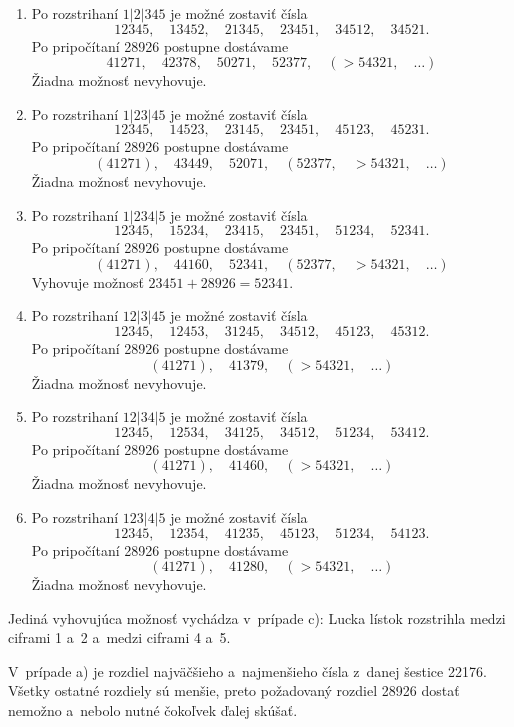 {\begin{enumerate}\alphatrue
\item
Po rozstrihaní $1|2|345$ je možné zostaviť čísla
$$
12345,\quad 13452,\quad 21345,\quad 23451,\quad 34512,\quad 34521.
$$
Po pripočítaní 28926 postupne dostávame
$$
41271,\quad 42378,\quad 50271, \quad 52377,\quad (>54321,\quad\dots)
$$
Žiadna možnosť nevyhovuje.
\item
Po rozstrihaní $1|23|45$ je možné zostaviť čísla
$$
12345,\quad 14523,\quad 23145,\quad 23451,\quad 45123,\quad 45231.
$$
Po pripočítaní 28926 postupne dostávame
$$
(41271),\quad 43449,\quad 52071,\quad (52377,\quad >54321,\quad\dots)
$$
Žiadna možnosť nevyhovuje.
\item
Po rozstrihaní $1|234|5$ je možné zostaviť čísla
$$
12345,\quad 15234,\quad 23415,\quad 23451,\quad 51234,\quad 52341.
$$
Po pripočítaní 28926 postupne dostávame
$$
(41271),\quad 44160,\quad 52341,\quad (52377,\quad >54321,\quad\dots)
$$
Vyhovuje možnosť $23451+28926=52341$.
\item
Po rozstrihaní $12|3|45$ je možné zostaviť čísla
$$
12345,\quad 12453,\quad 31245,\quad 34512,\quad 45123,\quad 45312.
$$
Po pripočítaní 28926 postupne dostávame
$$
(41271),\quad 41379,\quad (>54321,\quad\dots)
$$
Žiadna možnosť nevyhovuje.
\item
Po rozstrihaní $12|34|5$ je možné zostaviť čísla
$$
12345,\quad 12534,\quad 34125,\quad 34512,\quad 51234,\quad 53412.
$$
Po pripočítaní 28926 postupne dostávame
$$
(41271),\quad 41460,\quad (>54321,\quad\dots)
$$
Žiadna možnosť nevyhovuje.
\item
Po rozstrihaní $123|4|5$ je možné zostaviť čísla
$$
12345,\quad 12354,\quad 41235,\quad 45123,\quad 51234,\quad 54123.
$$
Po pripočítaní 28926 postupne dostávame
$$
(41271),\quad 41280,\quad (>54321,\quad\dots)
$$
Žiadna možnosť nevyhovuje.
\end{enumerate}
Jediná vyhovujúca možnosť vychádza v~prípade c):
Lucka lístok rozstrihla medzi ciframi 1 a~2 a~medzi ciframi 4 a~5.

\poznamka
V~prípade a) je rozdiel najväčšieho a~najmenšieho čísla z~danej šestice 22176.
Všetky ostatné rozdiely sú menšie, preto požadovaný rozdiel 28926 dostať nemožno a~nebolo nutné čokoľvek ďalej skúšať.
}

